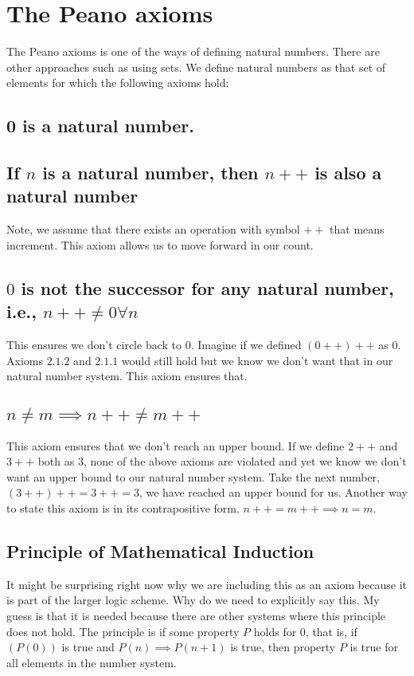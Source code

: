 \documentclass{report}
\begin{document}
\section{The Peano axioms}
The Peano axioms is one of the ways of defining natural numbers. There are other approaches such as using sets.
We define natural numbers as that set of elements for which the following axioms hold:
\subsection{0 is a natural number.}
\subsection{If $n$ is a natural number, then $n++$ is also a natural number}
Note, we assume that there exists an operation with symbol $++$ that means increment. This axiom allows us to move forward in our count.
\subsection{$0$ is not the successor for any natural number, i.e., $n++ \neq 0 \forall n$}
This ensures we don't circle back to $0$. Imagine if we defined  $\left( 0++ \right) ++ $ as $0$. Axioms $2.1.2$ and $2.1.1$ would still hold but we know we don't want that in our natural number system. This axiom ensures that. 
\subsection{$n \neq m \implies n++ \neq m++$}
This axiom ensures that we don't reach an upper bound. If we define $2++$ and  $3++$ both as $3$, none of the above axioms are violated and yet we know we don't want an upper bound to our natural number system. Take the next number, $(3++)++ = 3++ = 3$, we have reached an upper bound for us.
Another way to state this axiom is in its contrapositive form. $n++ = m++ \implies n = m$.
\subsection{Principle of Mathematical Induction}
It might be surprising right now why we are including this as an axiom because it is part of the larger logic scheme. Why do we need to explicitly say this. My guess is that it is needed because there are other systems where this principle does not hold. 
The principle is if some property $P$ holds for $0$, that is, if $\left( P\left( 0 \right)  \right) $ is true and  $P\left( n \right) \implies P\left( n+1 \right) $ is true, then property $P$ is true for all elements in the number system. 
\end{document}
